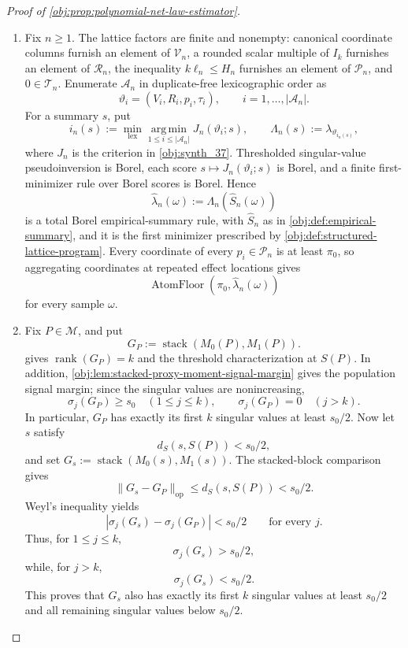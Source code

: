 \begin{proof}[Proof of \cref{obj:prop:polynomial-net-law-estimator}]
\begin{enumerate}
\item Fix \(n\ge1\).  The lattice factors are finite and nonempty: canonical coordinate columns furnish an element of \(\mathcal V_n\), a rounded scalar multiple of \(I_k\) furnishes an element of \(\mathcal R_n\), the inequality \(k\ell_n\le H_n\) furnishes an element of \(\mathcal P_n\), and \(0\in\mathcal T_n\).  Enumerate \(\mathcal A_n\) in duplicate-free lexicographic order as
\[
\vartheta_i=(V_i,R_i,p_i,\tau_i),
\qquad i=1,\ldots,|\mathcal A_n|.
\]
For a summary \(s\), put
\[
i_n(s):=
\min_{\mathrm{lex}}\operatorname*{arg\,min}_{1\le i\le|\mathcal A_n|}
J_n(\vartheta_i;s),
\qquad
\Lambda_n(s):=\lambda_{\vartheta_{i_n(s)}} ,
\]
where \(J_n\) is the criterion in \cref{obj:synth_37}.  Thresholded singular-value pseudoinversion is Borel, each score \(s\mapsto J_n(\vartheta_i;s)\) is Borel, and a finite first-minimizer rule over Borel scores is Borel.  Hence
\[
\widehat\lambda_n(\omega):=\Lambda_n(\widehat S_n(\omega))
\]
is a total Borel empirical-summary rule, with \(\widehat S_n\) as in \cref{obj:def:empirical-summary}, and it is the first minimizer prescribed by \cref{obj:def:structured-lattice-program}.  Every coordinate of every \(p_i\in\mathcal P_n\) is at least \(\pi_0\), so aggregating coordinates at repeated effect locations gives
\[
\operatorname{AtomFloor}(\pi_0,\widehat\lambda_n(\omega))
\]
for every sample \(\omega\). %

\item Fix \(P\in\mathcal M\), and put
\[
G_P:=\operatorname{stack}(M_0(P),M_1(P)).
\]
 gives \(\operatorname{rank}(G_P)=k\) and the threshold characterization at \(S(P)\).  In addition, \cref{obj:lem:stacked-proxy-moment-signal-margin} gives the population signal margin; since the singular values are nonincreasing,
\[
\sigma_j(G_P)\ge s_0\quad (1\le j\le k),
\qquad
\sigma_j(G_P)=0\quad (j>k).
\]
In particular, \(G_P\) has exactly its first \(k\) singular values at least \(s_0/2\).  Now let \(s\) satisfy
\[
d_S(s,S(P))<s_0/2,
\]
and set \(G_s:=\operatorname{stack}(M_0(s),M_1(s))\).  The stacked-block comparison gives
\[
\|G_s-G_P\|_{\mathrm{op}}\le d_S(s,S(P))<s_0/2.
\]
Weyl's inequality yields
\[
|\sigma_j(G_s)-\sigma_j(G_P)|<s_0/2
\qquad\text{for every }j.
\]
Thus, for \(1\le j\le k\),
\[
\sigma_j(G_s)>s_0/2,
\]
while, for \(j>k\),
\[
\sigma_j(G_s)<s_0/2.
\]
This proves that \(G_s\) also has exactly its first \(k\) singular values at least \(s_0/2\) and all remaining singular values below \(s_0/2\). %


\end{enumerate}
\end{proof}
